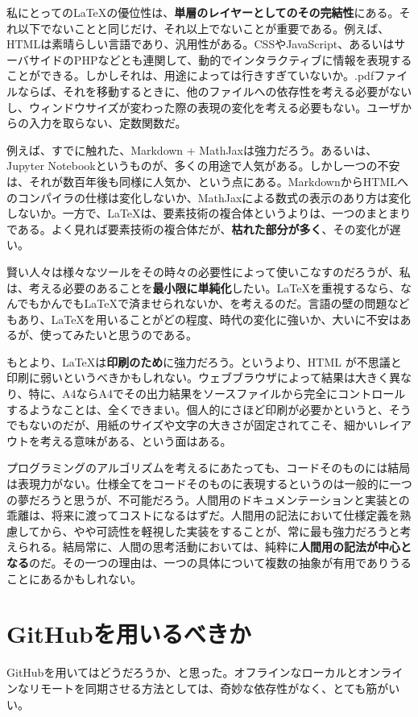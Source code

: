 \documentclass[uplatex,dvipdfmx]{jsarticle} \usepackage{amsmath,amssymb,bm}
\begin{document}
私にとっての\LaTeX の優位性は、{\bf 単層のレイヤーとしてのその完結性}にある。それ以下でないことと同じだけ、それ以上でないことが重要である。例えば、HTMLは素晴らしい言語であり、汎用性がある。CSSやJavaScript、あるいはサーバサイドのPHPなどとも連関して、動的でインタラクティブに情報を表現することができる。しかしそれは、用途によっては行きすぎていないか。.pdfファイルならば、それを移動するときに、他のファイルへの依存性を考える必要がないし、ウィンドウサイズが変わった際の表現の変化を考える必要もない。ユーザからの入力を取らない、定数関数だ。

例えば、すでに触れた、Markdown + MathJaxは強力だろう。あるいは、Jupyter Notebookというものが、多くの用途で人気がある。しかし一つの不安は、それが数百年後も同様に人気か、という点にある。MarkdownからHTMLへのコンパイラの仕様は変化しないか、MathJaxによる数式の表示のあり方は変化しないか。一方で、\LaTeX は、要素技術の複合体というよりは、一つのまとまりである。よく見れば要素技術の複合体だが、{\bf 枯れた部分が多く}、その変化が遅い。

賢い人々は様々なツールをその時々の必要性によって使いこなすのだろうが、私は、考える必要のあることを{\bf 最小限に単純化}したい。\LaTeX を重視するなら、なんでもかんでも\LaTeX で済ませられないか、を考えるのだ。言語の壁の問題などもあり、\LaTeX を用いることがどの程度、時代の変化に強いか、大いに不安はあるが、使ってみたいと思うのである。

もとより、\LaTeX は{\bf 印刷のため}に強力だろう。というより、HTML が不思議と印刷に弱いというべきかもしれない。ウェブブラウザによって結果は大きく異なり、特に、A4ならA4でその出力結果をソースファイルから完全にコントロールするようなことは、全くできまい。個人的にさほど印刷が必要かというと、そうでもないのだが、用紙のサイズや文字の大きさが固定されてこそ、細かいレイアウトを考える意味がある、という面はある。

プログラミングのアルゴリズムを考えるにあたっても、コードそのものには結局は表現力がない。仕様全てをコードそのものに表現するというのは一般的に一つの夢だろうと思うが、不可能だろう。人間用のドキュメンテーションと実装との乖離は、将来に渡ってコストになるはずだ。人間用の記法において仕様定義を熟慮してから、やや可読性を軽視した実装をすることが、常に最も強力だろうと考えられる。結局常に、人間の思考活動においては、純粋に{\bf 人間用の記法が中心となる}のだ。その一つの理由は、一つの具体について複数の抽象が有用でありうることにあるかもしれない。



\section*{GitHubを用いるべきか}
GitHubを用いてはどうだろうか、と思った。オフラインなローカルとオンラインなリモートを同期させる方法としては、奇妙な依存性がなく、とても筋がいい。
\end{document}
